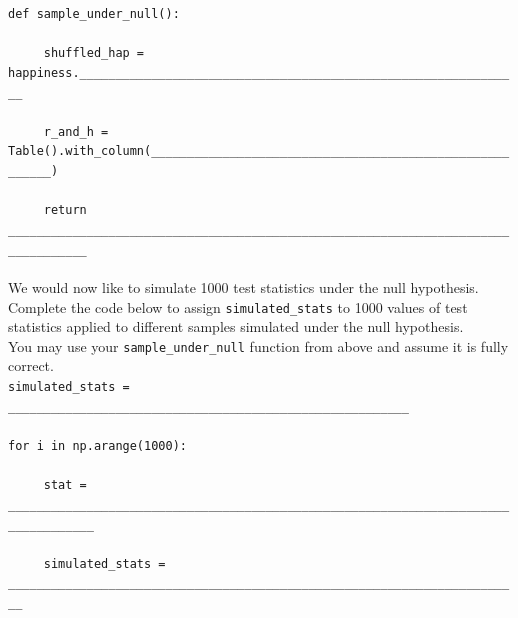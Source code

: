 \begin{enumerate}
\lstinline{def sample_under_null():} \\ \\
\lstinline{     shuffled_hap = happiness.______________________________________________________________} \\ \\
\lstinline{     r_and_h = Table().with_column(________________________________________________________)} \\ \\
\lstinline{     return _________________________________________________________________________________} \\ \\
 We would now like to simulate 1000 test statistics under the null hypothesis. Complete the code below to assign {\tt simulated\_stats} to 1000 values of test statistics applied to different samples simulated under the null hypothesis. \\ 
You may use your {\tt sample\_under\_null} function from above and assume it is fully correct. \\


\lstinline{simulated_stats = ________________________________________________________} \\ \\
\lstinline{for i in np.arange(1000):} \\ \\
\lstinline{     stat = __________________________________________________________________________________} \\ \\
\lstinline{     simulated_stats = ________________________________________________________________________} \\ \\


\end{enumerate}
